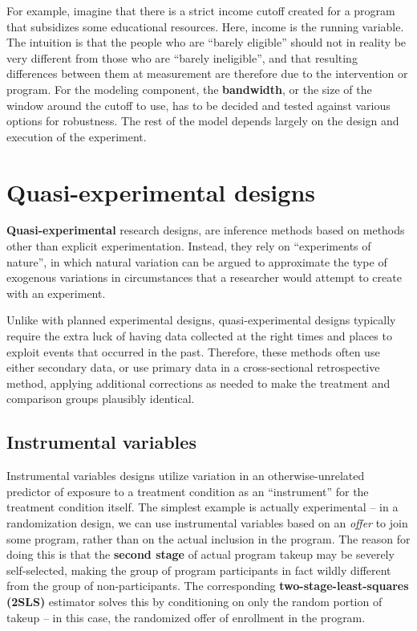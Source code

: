 For example, imagine that there is a strict income cutoff created
for a program that subsidizes some educational resources.
Here, income is the running variable.
The intuition is that the people who are ``barely eligible''
should not in reality be very different from those who are ``barely ineligible'',
and that resulting differences between them at measurement
are therefore due to the intervention or program.\cite{imbens2008regression}
For the modeling component, the \textbf{bandwidth},
or the size of the window around the cutoff to use,
has to be decided and tested against various options for robustness.
The rest of the model depends largely on the design and execution of the experiment.


\section{Quasi-experimental designs}

\textbf{Quasi-experimental} research designs,
are inference methods based on methods other than explicit experimentation.
Instead, they rely on ``experiments of nature'',
in which natural variation can be argued to approximate
the type of exogenous variations in circumstances
that a researcher would attempt to create with an experiment.\cite{dinardo2016natural}

Unlike with planned experimental designs,
quasi-experimental designs typically require the extra luck
of having data collected at the right times and places
to exploit events that occurred in the past.
Therefore, these methods often use either secondary data,
or use primary data in a cross-sectional retrospective method,
applying additional corrections as needed to make
the treatment and comparison groups plausibly identical.

\subsection{Instrumental variables}

Instrumental variables designs utilize variation in an
otherwise-unrelated predictor of exposure to a treatment condition
as an ``instrument'' for the treatment condition itself.
The simplest example is actually experimental --
in a randomization design, we can use instrumental variables
based on an \textit{offer} to join some program,
rather than on the actual inclusion in the program.\cite{angrist2001instrumental}
The reason for doing this is that the \textbf{second stage}
of actual program takeup may be severely self-selected,
making the group of program participants in fact
wildly different from the group of non-participants.
The corresponding \textbf{two-stage-least-squares (2SLS)} estimator
solves this by conditioning on only the random portion of takeup --
in this case, the randomized offer of enrollment in the program.


